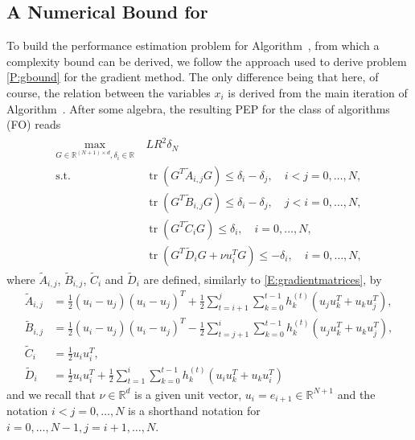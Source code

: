 \documentclass[12pt]{article}
\numberwithin{equation}{section}
\theoremstyle{definition}
\theoremstyle{remark}
\DeclareMathOperator{\trace}{tr}
\newcommand{\mainalg}{\text{FO}\xspace}
\begin{document}
\subsection{A Numerical Bound for \mainalg}

To build the performance estimation problem for Algorithm~\mainalg, from which a complexity
bound can be derived, we follow the approach %
used to derive problem \eqref{P:gbound} for the gradient method. The only difference being
that here, of course, the relation between the variables $x_i$ is derived from the main
iteration of Algorithm~\mainalg. After some algebra, the resulting PEP for the class of
algorithms (FO) reads
\begin{align*}
    \begin{aligned}
    \max_{G\in \mathbb{R}^{(N+1)\times d},\delta_i \in\mathbb{R}}\ &  LR^2 \delta_N \\
    \text{s.t. }
                        & \trace (G^T \tilde{A}_{i,j} G) \leq \delta_i - \delta_j,\quad    i<j=0,\dots,N, \\
                        & \trace(G^T \tilde{B}_{i,j} G) \leq \delta_i - \delta_j,\quad      j<i=0,\dots,N, \\
                        & \trace(G^T \tilde{C}_i G) \leq \delta_i,\quad                             i=0,\dots,N, \\
                        & \trace(G^T \tilde{D}_i G+ \nu u_i^T G ) \leq - \delta_i,\quad     i=0,\dots,N,
    \end{aligned}
    \tag{Q}\label{P:fop}
\end{align*}
where  $\tilde{A}_{i,j}$, $\tilde{B}_{i,j}$, $\tilde{C}_i$ and $\tilde{D}_i$ are defined, similarly to \eqref{E:gradientmatrices}, by
\begin{equation}\label{E:defmatrices}
\begin{aligned}
    \tilde{A}_{i,j} &= \frac{1}{2} (u_i-u_j)(u_i-u_j)^T + \frac{1}{2}\sum_{t=i+1}^{j} \sum_{k=0}^{t-1} h_k^{(t)}(u_j u_k^T+u_k u_j^T),\\
    \tilde{B}_{i,j} &= \frac{1}{2} (u_i-u_j)(u_i-u_j)^T -  \frac{1}{2}\sum_{t=j+1}^{i} \sum_{k=0}^{t-1} h_k^{(t)}(u_j u_k^T+u_k u_j^T),\\
    \tilde{C}_i &= \frac{1}{2} u_i u_i^T,\\
    \tilde{D}_i &= \frac{1}{2} u_i u_i^T+  \frac{1}{2}\sum_{t=1}^{i} \sum_{k=0}^{t-1} h_k^{(t)} (u_i u_k^T + u_k u_i^T)
\end{aligned}
\end{equation}
and we recall that $\nu \in \mathbb{R}^d$ is a given unit vector, $u_i=e_{i+1}\in\mathbb{R}^{N+1}$ and
the notation $i <j=0,\dots,N$ is a shorthand notation for $i=0,\dots,N-1, j= i+1,\dots, N$.
\end{document}
